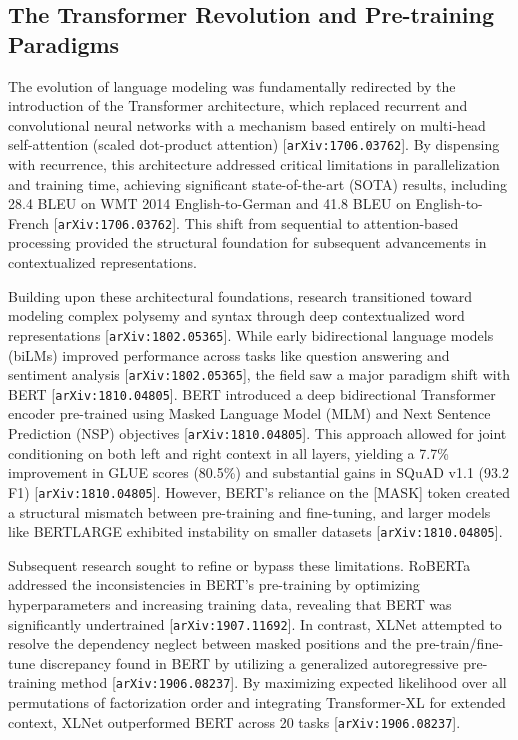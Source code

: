 \documentclass[11pt]{article}
\begin{document}
\subsection{The Transformer Revolution and Pre-training Paradigms}

The evolution of language modeling was fundamentally redirected by the introduction of the Transformer architecture, which replaced recurrent and convolutional neural networks with a mechanism based entirely on multi-head self-attention (scaled dot-product attention) [\texttt{arXiv:1706.03762}]. By dispensing with recurrence, this architecture addressed critical limitations in parallelization and training time, achieving significant state-of-the-art (SOTA) results, including 28.4 BLEU on WMT 2014 English-to-German and 41.8 BLEU on English-to-French [\texttt{arXiv:1706.03762}]. This shift from sequential to attention-based processing provided the structural foundation for subsequent advancements in contextualized representations.

Building upon these architectural foundations, research transitioned toward modeling complex polysemy and syntax through deep contextualized word representations [\texttt{arXiv:1802.05365}]. While early bidirectional language models (biLMs) improved performance across tasks like question answering and sentiment analysis [\texttt{arXiv:1802.05365}], the field saw a major paradigm shift with BERT [\texttt{arXiv:1810.04805}]. BERT introduced a deep bidirectional Transformer encoder pre-trained using Masked Language Model (MLM) and Next Sentence Prediction (NSP) objectives [\texttt{arXiv:1810.04805}]. This approach allowed for joint conditioning on both left and right context in all layers, yielding a 7.7\% improvement in GLUE scores (80.5\%) and substantial gains in SQuAD v1.1 (93.2 F1) [\texttt{arXiv:1810.04805}]. However, BERT's reliance on the [MASK] token created a structural mismatch between pre-training and fine-tuning, and larger models like BERTLARGE exhibited instability on smaller datasets [\texttt{arXiv:1810.04805}].

Subsequent research sought to refine or bypass these limitations. RoBERTa addressed the inconsistencies in BERT's pre-training by optimizing hyperparameters and increasing training data, revealing that BERT was significantly undertrained [\texttt{arXiv:1907.11692}]. In contrast, XLNet attempted to resolve the dependency neglect between masked positions and the pre-train/fine-tune discrepancy found in BERT by utilizing a generalized autoregressive pre-training method [\texttt{arXiv:1906.08237}]. By maximizing expected likelihood over all permutations of factorization order and integrating Transformer-XL for extended context, XLNet outperformed BERT across 20 tasks [\texttt{arXiv:1906.08237}].
\end{document}
